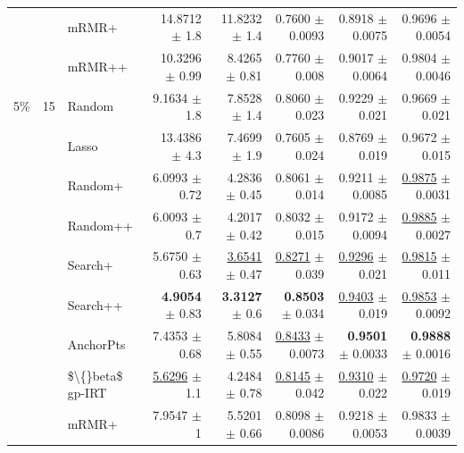 \begin{longtable}{llp{}rrrrr}
 &  & mRMR+ & 14.8712 {\scriptsize $\pm$ 1.8} & 11.8232 {\scriptsize $\pm$ 1.4} & 0.7600 {\scriptsize $\pm$ 0.0093} & 0.8918 {\scriptsize $\pm$ 0.0075} & 0.9696 {\scriptsize $\pm$ 0.0054} \\
 &  & mRMR++ & 10.3296 {\scriptsize $\pm$ 0.99} & 8.4265 {\scriptsize $\pm$ 0.81} & 0.7760 {\scriptsize $\pm$ 0.008} & 0.9017 {\scriptsize $\pm$ 0.0064} & 0.9804 {\scriptsize $\pm$ 0.0046} \\
\midrule
5\% & 15 & Random & 9.1634 {\scriptsize $\pm$ 1.8} & 7.8528 {\scriptsize $\pm$ 1.4} & 0.8060 {\scriptsize $\pm$ 0.023} & 0.9229 {\scriptsize $\pm$ 0.021} & 0.9669 {\scriptsize $\pm$ 0.021} \\
 &  & Lasso & 13.4386 {\scriptsize $\pm$ 4.3} & 7.4699 {\scriptsize $\pm$ 1.9} & 0.7605 {\scriptsize $\pm$ 0.024} & 0.8769 {\scriptsize $\pm$ 0.019} & 0.9672 {\scriptsize $\pm$ 0.015} \\
 &  & Random+ & 6.0993 {\scriptsize $\pm$ 0.72} & 4.2836 {\scriptsize $\pm$ 0.45} & 0.8061 {\scriptsize $\pm$ 0.014} & 0.9211 {\scriptsize $\pm$ 0.0085} & \underline{0.9875} {\scriptsize $\pm$ 0.0031} \\
 &  & Random++ & 6.0093 {\scriptsize $\pm$ 0.7} & 4.2017 {\scriptsize $\pm$ 0.42} & 0.8032 {\scriptsize $\pm$ 0.015} & 0.9172 {\scriptsize $\pm$ 0.0094} & \underline{0.9885} {\scriptsize $\pm$ 0.0027} \\
 &  & Search+ & 5.6750 {\scriptsize $\pm$ 0.63} & \underline{3.6541} {\scriptsize $\pm$ 0.47} & \underline{0.8271} {\scriptsize $\pm$ 0.039} & \underline{0.9296} {\scriptsize $\pm$ 0.021} & \underline{0.9815} {\scriptsize $\pm$ 0.011} \\
 &  & Search++ & \textbf{4.9054} {\scriptsize $\pm$ 0.83} & \textbf{3.3127} {\scriptsize $\pm$ 0.6} & \textbf{0.8503} {\scriptsize $\pm$ 0.034} & \underline{0.9403} {\scriptsize $\pm$ 0.019} & \underline{0.9853} {\scriptsize $\pm$ 0.0092} \\
 &  & AnchorPts & 7.4353 {\scriptsize $\pm$ 0.68} & 5.8084 {\scriptsize $\pm$ 0.55} & \underline{0.8433} {\scriptsize $\pm$ 0.0073} & \textbf{0.9501} {\scriptsize $\pm$ 0.0033} & \textbf{0.9888} {\scriptsize $\pm$ 0.0016} \\
 &  & \$\textbackslash\{\}beta\$ gp-IRT & \underline{5.6296} {\scriptsize $\pm$ 1.1} & 4.2484 {\scriptsize $\pm$ 0.78} & \underline{0.8145} {\scriptsize $\pm$ 0.042} & \underline{0.9310} {\scriptsize $\pm$ 0.022} & \underline{0.9720} {\scriptsize $\pm$ 0.019} \\
 &  & mRMR+ & 7.9547 {\scriptsize $\pm$ 1} & 5.5201 {\scriptsize $\pm$ 0.66} & 0.8098 {\scriptsize $\pm$ 0.0086} & 0.9218 {\scriptsize $\pm$ 0.0053} & 0.9833 {\scriptsize $\pm$ 0.0039} \\

\end{longtable}
